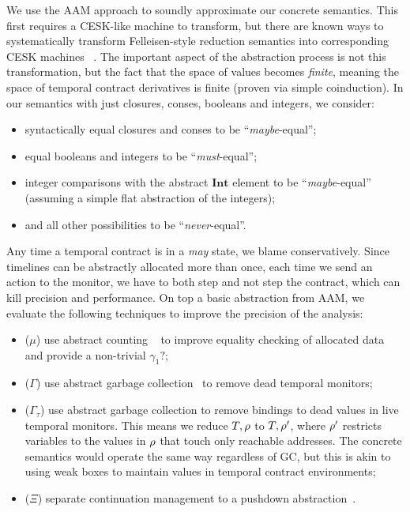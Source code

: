 We use the AAM approach to soundly approximate our concrete semantics.
%
This first requires a CESK-like machine to transform, but there are known ways to systematically transform Felleisen-style reduction semantics into corresponding CESK machines ~\citep{dvanhorn:Danvy-Nielsen:RS-04-26}.
%
The important aspect of the abstraction process is not this transformation, but the fact that the space of values becomes \emph{finite}, meaning the space of temporal contract derivatives is finite (proven via simple coinduction).
%
In our semantics with just closures, conses, booleans and integers, we consider:
\begin{itemize}
 \item syntactically equal closures and conses to be ``\emph{maybe}-equal'';
 \item equal booleans and integers to be ``\emph{must}-equal'';
 \item integer comparisons with the abstract $\mathbf{Int}$ element to be ``\emph{maybe}-equal'' (assuming a simple flat abstraction of the integers);
 \item and all other possibilities to be ``\emph{never}-equal''.
\end{itemize}
%
Any time a temporal contract is in a \emph{may} state, we blame conservatively.
%
Since timelines can be abstractly allocated more than once, each time we send an action to the monitor, we have to both step and not step the contract, which can kill precision and performance.
%
On top a basic abstraction from AAM, we evaluate the following techniques to improve the precision of the analysis:
\begin{itemize}
\item{($\mu$) use abstract counting ~\citep{dvanhorn:Might:2006:GammaCFA} to improve equality checking of allocated data and provide a non-trivial $\gamma_1?$;}
\item{($\Gamma$) use abstract garbage collection~\citep{dvanhorn:Might:2006:GammaCFA} to remove dead temporal monitors;}
\item{($\Gamma_\tau$) use abstract garbage collection to remove bindings to dead values in live temporal monitors.
%
This means we reduce $T,\rho$ to $T,\rho'$, where $\rho'$ restricts variables to the values in $\rho$ that touch only reachable addresses.
%
The concrete semantics would operate the same way regardless of GC, but this is akin to using weak boxes to maintain values in temporal contract environments;}
\item{($\Xi$) separate continuation management to a pushdown abstraction~\citep{dvanhorn:Vardoulakis2011CFA2}.}%
\end{itemize}

